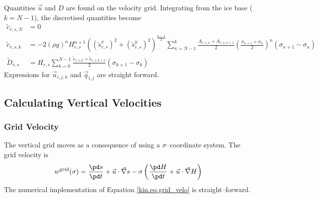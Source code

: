 Quantities $\vec u$ and $D$ are found on the velocity grid. Integrating from the ice base ($k=N-1$), the discretised quantities become
\begin{subequations}
  \begin{align}
    \tilde{c}_{r,s,N}&=0\\
    \tilde{c}_{r,s,k}&=-2(\rho g)^nH_{r,s}^{n+1}\left(({\tilde{s}^x_{r,s}})^2+({\tilde{s}^y_{r,s}})^2\right)^{\frac{n-1}{2}}\sum_{\kappa=N-1}^k\frac{A_{r,s,\kappa}+A_{r,s,\kappa+1}}2 \left(\frac{\sigma_{\kappa+1}+\sigma_\kappa}2\right)^n(\sigma_{\kappa+1}-\sigma_\kappa)\\
    \tilde{D}_{r,s}&=H_{r,s}\sum_{k=0}^{N-1}\frac{\tilde{c}_{r,s,k}+\tilde{c}_{r,s,k+1}}2(\sigma_{k+1}-\sigma_k)
  \end{align}      
\end{subequations}
Expressions for $\vec{u}_{i,j,k}$ and $\vec{q}_{i,j}$ are straight forward.

\subsection{Calculating Vertical Velocities}

\subsubsection{Grid Velocity}
The vertical grid moves as a consequence of using a $\sigma$--coordinate system. The grid velocity is
\begin{equation}
  \label{kin.eq.grid_velo}
  w^{\text{grid}}(\sigma)=\frac{\pd s}{\pd t}+\vec u\cdot\vec\nabla s-\sigma\left(\frac{\pd H}{\pd t}+\vec u\cdot\vec\nabla H\right)
\end{equation}
The numerical implementation of Equation \eqref{kin.eq.grid_velo} is straight--forward.

